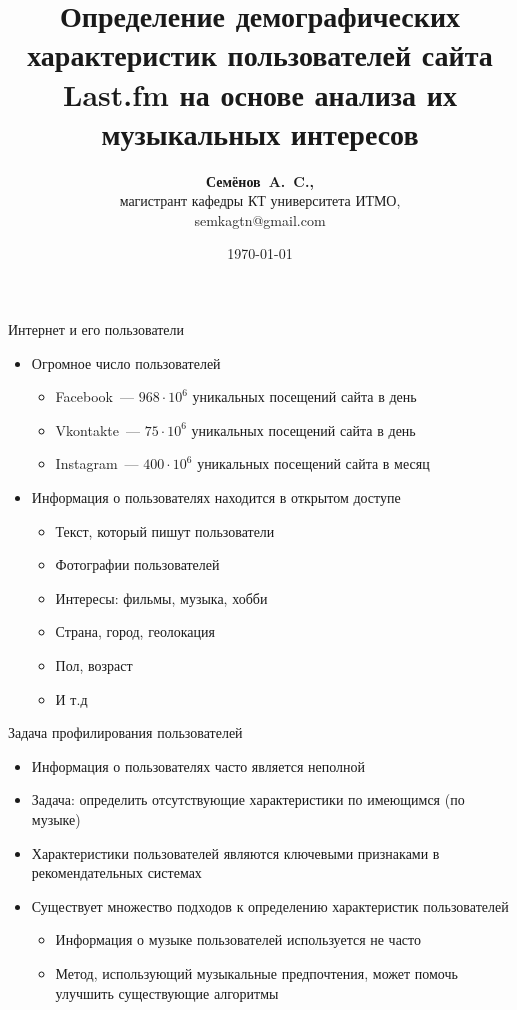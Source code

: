 \documentclass{beamer}
\title{Определение демографических характеристик пользователей
сайта Last.fm на основе анализа их музыкальных интересов}
\author{\textbf{Семёнов~A.~C.,} \\ 
    магистрант кафедры КТ университета ИТМО, \\
    semkagtn@gmail.com}
\institute{СПИСОК 2016}
\date{\today}
\begin{document}
\begin{frame}
  \titlepage
\end{frame}

\begin{frame}{Интернет и его пользователи}
  \begin{itemize}
      \item {Огромное число пользователей}
          \begin{itemize}
              \item {Facebook~--- $968 \cdot 10^{6}$ уникальных посещений сайта в день}
              \item {Vkontakte~--- $75 \cdot 10^{6}$ уникальных посещений сайта в день}
              \item {Instagram~--- $400 \cdot 10^{6}$ уникальных посещений сайта в месяц}
          \end{itemize}
      \item {Информация о пользователях находится в открытом доступе}
          \begin{itemize}
              \item {Текст, который пишут пользователи}
              \item {Фотографии пользователей}
              \item {Интересы: фильмы, музыка, хобби}
              \item {Страна, город, геолокация}
              \item {Пол, возраст}
              \item {И т.д}
          \end{itemize}
  \end{itemize}
\end{frame}

\begin{frame}{Задача профилирования пользователей}
  \begin{itemize}
      \item {Информация о пользователях часто является неполной}
      \item {Задача: определить отсутствующие характеристики по имеющимся (по музыке)}
      \item {Характеристики пользователей являются ключевыми признаками в рекомендательных системах}
      \item {Существует множество подходов к определению характеристик пользователей}
          \begin{itemize}
              \item {Информация о музыке пользователей используется не часто}
              \item {Метод, использующий музыкальные предпочтения, может помочь улучшить существующие алгоритмы}
          \end{itemize}
  \end{itemize}
\end{frame}
\end{document}
